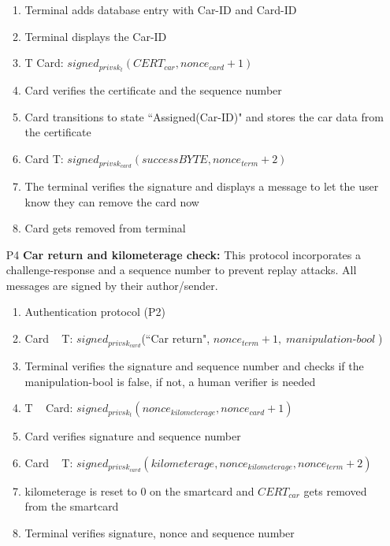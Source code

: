 \documentclass[a4paper]{article}
\newcommand{\escapevariablewithdashinmathmode}[1]{{\operatorname{\mathit{#1}}}}
\begin{document}
\begin{itemize}
\begin{enumerate}
        \item Terminal adds database entry with Car-ID and Card-ID
        \item Terminal displays the Car-ID
        \item T \textrightarrow Card: $signed_{privsk_t}(CERT_{car}, nonce_{card} + 1)$
        \item Card verifies the certificate and the sequence number 
        \item Card transitions to state ``Assigned(Car-ID)" and stores the car data from the certificate
        \item Card \textrightarrow T: $signed_{privsk_{card}}(successBYTE, nonce_{term} + 2)$
        \item The terminal verifies the signature and displays a message to let the user know they can remove the card now
        \item Card gets removed from terminal
    \end{enumerate}
    \item[P4] \textbf{Car return and kilometerage check:} This protocol incorporates a challenge-response and a sequence number to prevent replay attacks. All messages are signed by their author/sender.
    \begin{enumerate}
        \item Authentication protocol (P2)
        \item Card \textrightarrow~ T: $signed_{privsk_{card}}$(``Car return", $nonce_{term} + 1, \escapevariablewithdashinmathmode{manipulation-bool}$) 
        \item Terminal verifies the signature and sequence number and checks if the manipulation-bool is false, if not, a human verifier is needed
        \item T \textrightarrow~ Card: $signed_{privsk_t}(nonce_{kilometerage}, nonce_{card} + 1)$
        \item Card verifies signature and sequence number
        \item Card \textrightarrow~ T: $signed_{privsk_{card}}(kilometerage, nonce_{kilometerage}, nonce_{term} + 2)$
        \item kilometerage is reset to 0 on the smartcard and $CERT_{car}$ gets removed from the smartcard
        \item Terminal verifies signature, nonce and sequence number

\end{enumerate}
\end{itemize}
\end{document}

